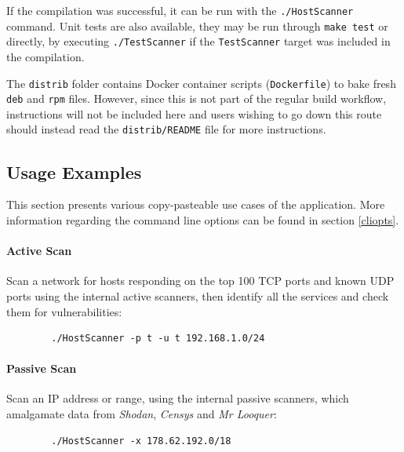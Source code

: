 \documentclass[a4paper,12pt]{article}
\begin{document}
	If the compilation was successful, it can be run with the \texttt{./HostScanner} command. Unit tests are also available, they may be run through \texttt{make test} or directly, by executing \texttt{./TestScanner} if the \texttt{TestScanner} target was included in the compilation.
	
	The \texttt{distrib} folder contains Docker container scripts (\texttt{Dockerfile}) to bake fresh \texttt{deb} and \texttt{rpm} files. However, since this is not part of the regular build workflow, instructions will not be included here and users wishing to go down this route should instead read the \texttt{distrib/README} file for more instructions.
	
\subsection{Usage Examples}
 
	
	This section presents various copy-pasteable use cases of the application. More information regarding the command line options can be found in section \ref{cliopts}.

	\vspace{-0.1in}
	\paragraph*{Active Scan} Scan a network for hosts responding on the top 100 TCP ports and known UDP ports using the internal active scanners, then identify all the services and check them for vulnerabilities:

	\begin{listing}[H]
	\begin{verbatim}
		./HostScanner -p t -u t 192.168.1.0/24
	\end{verbatim}
	\end{listing}

	\vspace{-0.4in}
	\paragraph*{Passive Scan} Scan an IP address or range, using the internal passive scanners, which amalgamate data from \textit{Shodan}, \textit{Censys} and \textit{Mr Looquer}:

	\begin{listing}[H]
	\begin{verbatim}
		./HostScanner -x 178.62.192.0/18
	\end{verbatim}
	\end{listing}
\end{document}
